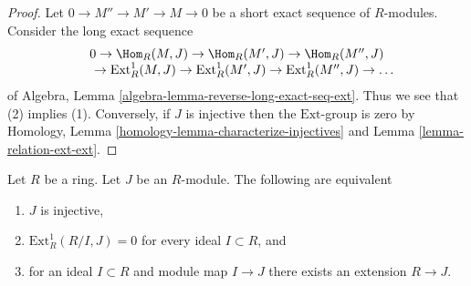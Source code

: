 \begin{proof}
Let $0 \to M'' \to M' \to M \to 0$ be a short exact sequence of $R$-modules.
Consider the long exact sequence
$$
\begin{matrix}
0
\to \Hom_R(M, J)
\to \Hom_R(M', J)
\to \Hom_R(M'', J)
\\
\phantom{0\ }
\to \text{Ext}^1_R(M, J)
\to \text{Ext}^1_R(M', J)
\to \text{Ext}^1_R(M'', J)
\to \ldots
\end{matrix}
$$
of Algebra, Lemma \ref{algebra-lemma-reverse-long-exact-seq-ext}.
Thus we see that (2) implies (1). Conversely, if $J$ is injective
then the $\text{Ext}$-group is zero by
Homology, Lemma \ref{homology-lemma-characterize-injectives} and
Lemma \ref{lemma-relation-ext-ext}.
\end{proof}

\begin{lemma}
\label{lemma-characterize-injective-bis}
Let $R$ be a ring. Let $J$ be an $R$-module.
The following are equivalent
\begin{enumerate}
\item $J$ is injective,
\item $\text{Ext}^1_R(R/I, J) = 0$ for every ideal $I \subset R$, and
\item for an ideal $I \subset R$ and module map $I \to J$
there exists an extension $R \to J$.
\end{enumerate}
\end{lemma}

